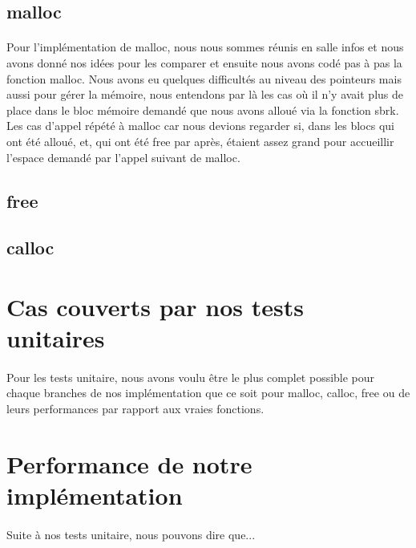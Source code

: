 \documentclass[10pt,a4paper]{article}
\begin{document}
\subsection{malloc}

\paragraph{}Pour l'implémentation de malloc, nous nous sommes réunis en salle infos et nous avons donné nos idées pour les comparer et ensuite nous avons codé pas à pas la fonction malloc. Nous avons eu quelques difficultés au niveau des pointeurs mais aussi pour gérer la mémoire, nous entendons par là les cas où il n'y avait plus de place dans le bloc mémoire demandé que nous avons alloué via la fonction sbrk. Les cas d'appel répété à malloc car nous devions regarder si, dans les blocs qui ont été alloué, et, qui ont été free par après, étaient assez grand pour accueillir l'espace demandé par l'appel suivant de malloc.

\subsection{free}


\subsection{calloc}


\section{Cas couverts par nos tests unitaires}

\paragraph{}Pour les tests unitaire, nous avons voulu être le plus complet possible pour chaque branches de nos implémentation que ce soit pour malloc, calloc, free ou de leurs performances par rapport aux vraies fonctions.


\section{Performance de notre implémentation}

\paragraph{}Suite à nos tests unitaire, nous pouvons dire que...


\end{document}
